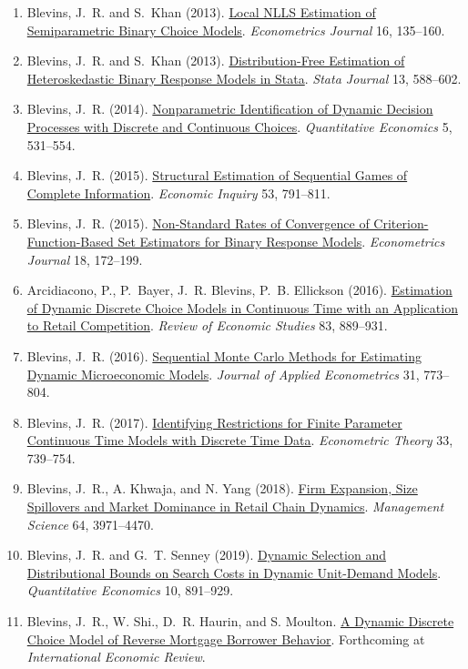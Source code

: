 \documentclass[10pt,letterpaper]{article}
\begin{document}
\begin{enumerate}
\item Blevins, J.~R. and S.~Khan (2013).
  \href{https://jblevins.org/research/lnlls}{Local NLLS Estimation of Semiparametric Binary Choice Models}.
  \textit{Econometrics Journal} 16, 135--160.
\item Blevins, J.~R. and S.~Khan (2013).
  \href{https://jblevins.org/research/dfbr/}{Distribution-Free Estimation of Heteroskedastic Binary Response Models in Stata}.
  \textit{Stata Journal} 13, 588--602.
\item Blevins, J.~R. (2014).
  \href{https://jblevins.org/research/dcident}{Nonparametric Identification of Dynamic Decision Processes with Discrete and Continuous Choices}.
  \textit{Quantitative Economics} 5, 531--554.
\item Blevins, J.~R. (2015).
  \href{https://jblevins.org/research/seqgame}{Structural Estimation of Sequential Games of Complete Information}.
  \textit{Economic Inquiry} 53, 791--811.
\item Blevins, J.~R. (2015).
  \href{https://jblevins.org/research/cuberoot}{Non-Standard Rates of Convergence of Criterion-Function-Based Set Estimators for Binary Response Models}.
  \textit{Econometrics Journal} 18, 172--199.
\item Arcidiacono, P., P.~Bayer, J.~R. Blevins, P.~B. Ellickson (2016).
  \href{https://jblevins.org/research/abbe}{Estimation of Dynamic Discrete Choice Models in Continuous Time with an Application to Retail Competition}.
  \textit{Review of Economic Studies} 83, 889--931.
\item Blevins, J.~R. (2016).
  \href{https://jblevins.org/research/smcdmm}{Sequential Monte Carlo Methods for Estimating Dynamic Microeconomic Models}.
  \textit{Journal of Applied Econometrics} 31, 773--804.
\item Blevins, J.~R. (2017).
  \href{https://jblevins.org/research/sde}{Identifying Restrictions for Finite Parameter Continuous Time Models with Discrete Time Data}.
  \textit{Econometric Theory} 33, 739--754.
\item Blevins, J.~R., A. Khwaja, and N. Yang (2018).
  \href{https://jblevins.org/research/bky}{Firm Expansion, Size Spillovers and Market Dominance in Retail Chain Dynamics}.
  \textit{Management Science} 64, 3971--4470.
\item Blevins, J.~R. and G.~T. Senney (2019).
  \href{https://jblevins.org/research/dcs}{Dynamic Selection and Distributional Bounds on Search Costs in Dynamic Unit-Demand Models}.
  \textit{Quantitative Economics} 10, 891--929.
\item Blevins, J.~R., W. Shi., D.~R. Haurin, and S. Moulton.
  \href{https://jblevins.org/research/ddc-hecm}{A Dynamic Discrete Choice Model of Reverse Mortgage Borrower Behavior}.
  Forthcoming at \textit{International Economic Review}.
\end{enumerate}
\end{document}
